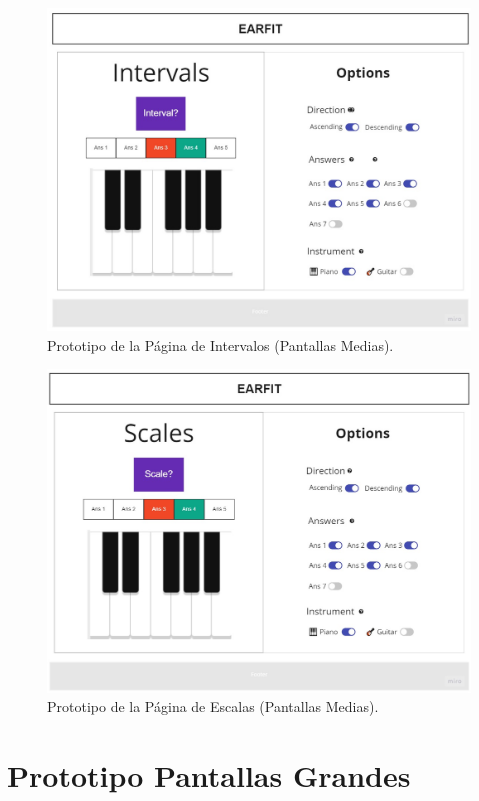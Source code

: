 \documentclass[12pt,twoside,titlepage]{report}
\begin{document}
\begin{figure}[H]
    \centering
    \includegraphics[scale=0.3]{Design Thinking/Prototipo/Medium/Intervals}
    \caption{Prototipo de la Página de Intervalos (Pantallas Medias).}
    \label{fig:Intervals}
\end{figure}

\begin{figure}[H]
    \centering
    \includegraphics[scale=0.3]{Design Thinking/Prototipo/Medium/Scales}
    \caption{Prototipo de la Página de Escalas (Pantallas Medias).}
    \label{fig:Scales}
\end{figure}

\section{Prototipo Pantallas Grandes}
\end{document}
